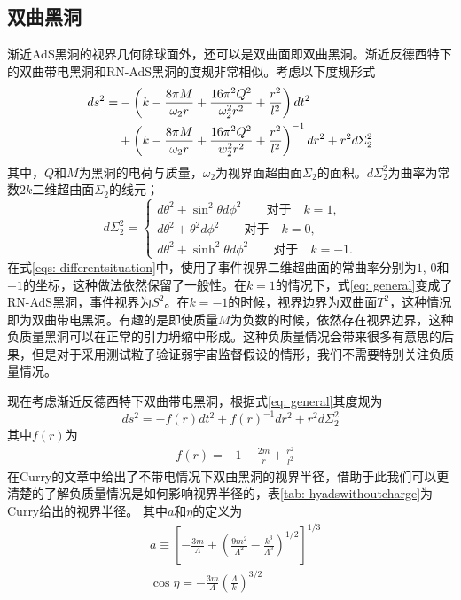 \subsection{双曲黑洞}
渐近AdS黑洞的视界几何除球面外，还可以是双曲面即双曲黑洞。渐近反德西特下的双曲带电黑洞和RN-AdS黑洞的度规非常相似。考虑以下度规形式\citep{cai1999topological}
\begin{align}\label{eq: general}
    ds^2=&-\left(k-\frac{8\pi M}{\omega_2 r}+\frac{16 \pi^2 Q^2}{\omega_2^2r^2}+\frac{r^2}{l^2}\right)dt^2 \notag \\
    &+\left(k-\frac{8\pi M}{\omega_2 r}+\frac{16\pi^2 Q^2}{w_2^2 r^2}+\frac{r^2}{l^2}\right)^{-1}dr^2+r^2d\Sigma_2^2
\end{align}
其中，$Q$和$M$为黑洞的电荷与质量，$\omega_2$为视界面超曲面$\Sigma_2$的面积。$d\Sigma_2^2$为曲率为常数$2k$二维超曲面$\Sigma_2$的线元；
\begin{equation}\label{eqs: differentsituation}
    d\Sigma^2_2=\begin{cases}
        d\theta^2+\sin ^2 \theta d\phi^2 \qquad \text{对于} \quad k=1, \\
        d\theta^2+ \theta^2 d\phi^2 \qquad \text{对于} \quad k=0, \\
        d\theta^2+\sinh ^2 \theta d\phi^2 \qquad \text{对于} \quad k=-1.
    \end{cases}
\end{equation}
在式\eqref{eqs: differentsituation}中，使用了事件视界二维超曲面的常曲率分别为$1$, $0$和$-1$的坐标，这种做法依然保留了一般性。在$k=1$的情况下，式\eqref{eq: general}变成了RN-AdS黑洞，事件视界为$S^2$。在$k=-1$的时候，视界边界为双曲面$T^2$，这种情况即为双曲带电黑洞。有趣的是即使质量$M$为负数的时候，依然存在视界边界，这种负质量黑洞可以在正常的引力坍缩中形成\citep{mann1997black,smith1997formation}。这种负质量情况会带来很多有意思的后果，但是对于采用测试粒子验证弱宇宙监督假设的情形，我们不需要特别关注负质量情况。

现在考虑渐近反德西特下双曲带电黑洞，根据式\eqref{eq: general}其度规为
\begin{equation}
    ds^2=-f\left(r\right)dt^2+f\left(r\right)^{-1}dr^2+r^2d\Sigma_{2}^2
\end{equation}
其中$f\left(r\right)$为
\begin{align}
    &f\left(r\right)=-1-\frac{2m}{r}+\frac{ r^2}{l^2}
\end{align}
在Curry的文章中\citep{curry1991vacuum}给出了不带电情况下双曲黑洞的视界半径，借助于此我们可以更清楚的了解负质量情况是如何影响视界半径的，表\ref{tab: hyadswithoutcharge}为Curry给出的视界半径。
其中$a$和$\eta$的定义为\begin{align*}
    &a \equiv \left[-\frac{3m}{\Lambda}+\left(\frac{9m^2}{\Lambda^2}-\frac{k^3}{\Lambda^3}\right)^{1/2}\right]^{1/3} \\
    &\cos \eta =-\frac{3m}{\Lambda}\left(\frac{\Lambda}{k}\right)^{3/2}
\end{align*}

